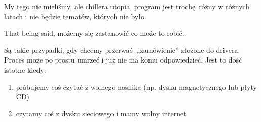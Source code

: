 My tego nie mieliśmy, ale chillera utopia, program jest trochę różny w różnych latach i nie będzie tematów, których nie było.

That being said, możemy się zastanowić co może to robić.

Są takie przypadki, gdy chcemy przerwać ,,zamówienie'' złożone do drivera. Proces może po prostu umrzeć i już nie ma komu odpowiedzieć.
Jest to dość istotne kiedy:
\begin{enumerate}
    \item próbujemy coś czytać z wolnego nośnika (np. dysku magnetycznego lub płyty CD)
    \item czytamy coś z dysku sieciowego i mamy wolny internet
\end{enumerate}